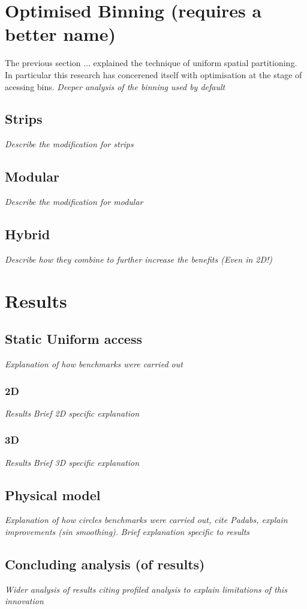 \section{Optimised Binning (requires a better name)\label{sec:innovation}}
  The previous section ... explained the technique of uniform spatial partitioning. In particular this research has concerened itself with optimisation at the stage of acessing bins.
  \textit{Deeper analysis of the binning used by default}

  \subsection{Strips}
    \textit{Describe the modification for strips}

  \subsection{Modular}
    \textit{Describe the modification for modular}

  \subsection{Hybrid}
    \textit{Describe how they combine to further increase the benefits (Even in 2D!)}
    

\section{Results\label{sec:results}}

  \subsection{Static Uniform access}
    \textit{Explanation of how benchmarks were carried out}
  
    \subsubsection{2D}
      \textit{Results}
      \textit{Brief 2D specific explanation}

    \subsubsection{3D}
      \textit{Results}
      \textit{Brief 3D specific explanation}

  \subsection{Physical model}
    \textit{Explanation of how circles benchmarks were carried out, cite Padabs, explain improvements (sin smoothing).}
      \textit{Brief explanation specific to results}

  \subsection{Concluding analysis (of results)}
    \textit{Wider analysis of results citing profiled analysis to explain limitations of this innovation}

